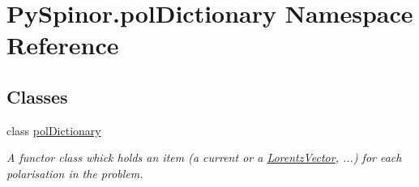 \hypertarget{namespace_py_spinor_1_1pol_dictionary}{}\section{Py\+Spinor.\+pol\+Dictionary Namespace Reference}
\label{namespace_py_spinor_1_1pol_dictionary}
\subsection*{Classes}
\begin{DoxyCompactItemize}
\item 
class \hyperlink{class_py_spinor_1_1pol_dictionary_1_1pol_dictionary}{pol\+Dictionary}
\begin{DoxyCompactList}\small\item\em A functor class whick holds an item (a current or a \hyperlink{namespace_py_spinor_1_1_lorentz_vector}{Lorentz\+Vector}, ...) for each polarisation in the problem. \end{DoxyCompactList}\end{DoxyCompactItemize}
